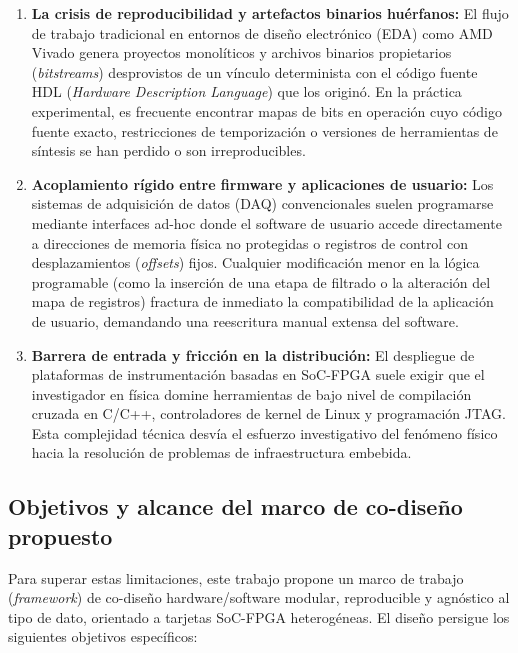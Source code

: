 \documentclass[standalone]{subfiles}
\begin{document}
\begin{enumerate}
    \item \textbf{La crisis de reproducibilidad y artefactos binarios huérfanos:} El flujo de trabajo tradicional en entornos de diseño electrónico (EDA) como AMD Vivado genera proyectos monolíticos y archivos binarios propietarios (\textit{bitstreams}) desprovistos de un vínculo determinista con el código fuente HDL (\textit{Hardware Description Language}) que los originó. En la práctica experimental, es frecuente encontrar mapas de bits en operación cuyo código fuente exacto, restricciones de temporización o versiones de herramientas de síntesis se han perdido o son irreproducibles.
    
    \item \textbf{Acoplamiento rígido entre firmware y aplicaciones de usuario:} Los sistemas de adquisición de datos (DAQ) convencionales suelen programarse mediante interfaces ad-hoc donde el software de usuario accede directamente a direcciones de memoria física no protegidas o registros de control con desplazamientos (\textit{offsets}) fijos. Cualquier modificación menor en la lógica programable (como la inserción de una etapa de filtrado o la alteración del mapa de registros) fractura de inmediato la compatibilidad de la aplicación de usuario, demandando una reescritura manual extensa del software.
    
    \item \textbf{Barrera de entrada y fricción en la distribución:} El despliegue de plataformas de instrumentación basadas en SoC-FPGA suele exigir que el investigador en física domine herramientas de bajo nivel de compilación cruzada en C/C++, controladores de kernel de Linux y programación JTAG. Esta complejidad técnica desvía el esfuerzo investigativo del fenómeno físico hacia la resolución de problemas de infraestructura embebida.
\end{enumerate}

\subsection{Objetivos y alcance del marco de co-diseño propuesto}
\label{subsec:objetivos_framework}

Para superar estas limitaciones, este trabajo propone un marco de trabajo (\textit{framework}) de co-diseño hardware/software modular, reproducible y agnóstico al tipo de dato, orientado a tarjetas SoC-FPGA heterogéneas. El diseño persigue los siguientes objetivos específicos:
\end{document}
